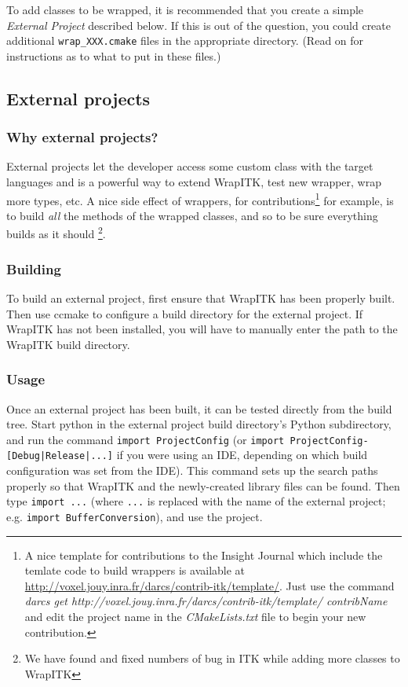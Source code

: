 \documentclass{InsightArticle}
\begin{document}
To add classes to be wrapped, it is recommended that you create a simple
{\em External Project} described below. If this is out of the question, you could
create additional \verb$wrap_XXX.cmake$ files in the appropriate directory. (Read on
for instructions as to what to put in these files.)


  \subsection{External projects}

    \subsubsection{Why external projects?}

External projects let the developer access some custom class with the target languages
and is a powerful way to extend WrapITK, test new wrapper, wrap more types, etc.
A nice side effect of wrappers, for contributions\footnote{A nice template for
contributions to the Insight Journal \cite{InsightJournalWebSite} which include the 
temlate code to build wrappers is available at
\url{http://voxel.jouy.inra.fr/darcs/contrib-itk/template/}. Just use the command
{\em darcs get http://voxel.jouy.inra.fr/darcs/contrib-itk/template/ contribName}
and edit the project name in the {\em CMakeLists.txt} file to
begin your new contribution.} for example, is to build {\em all}
the methods of the wrapped classes, and so to be sure everything builds as it should
\footnote{We have found and fixed numbers of bug in ITK while adding
more classes to WrapITK}.


    \subsubsection{Building}
To build an external project, first ensure that WrapITK has been properly built.
Then use ccmake to configure a build directory for the external project. If
WrapITK has not been installed, you will have to manually enter the path to the
WrapITK build directory.

    \subsubsection{Usage}
Once an external project has been built, it can be tested directly from the
build tree. Start python in the external project build directory's Python
subdirectory, and run the command \verb$import ProjectConfig$ (or 
\verb$import ProjectConfig-[Debug|Release|...]$ if you were using an IDE, depending on which
build configuration was set from the IDE). This command sets up the search paths
properly so that WrapITK and the newly-created library files can be found. Then
type \verb$import ...$ (where \verb$...$ is replaced with the name of the external
project; e.g. \verb$import BufferConversion$), and use the project.
\end{document}
